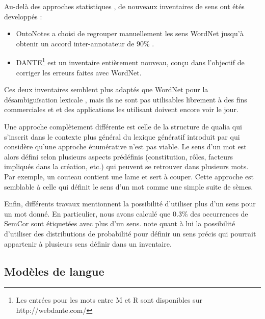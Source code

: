 
Au-delà des approches statistiques \citep{snow2007learning}, de nouveaux
inventaires de sens ont étés developpés :

\begin{itemize}

    \item OntoNotes \citep{hovy2006ontonotes} a choisi de regrouper
        manuellement les sens WordNet jusqu'à obtenir un accord
        inter-annotateur de 90\% .

    \item DANTE\footnote{Les entrées pour les mots entre M et R sont
        disponibles sur http://webdante.com/} \citep{mccarthy2010dante} est un
        inventaire entièrement nouveau, conçu dans l'objectif de corriger les
        erreurs faites avec WordNet\citep{kilgarriff2010detailed}.


\end{itemize}

Ces deux inventaires semblent plus adaptés que WordNet pour la désambiguïsation
lexicale \citep{navigli2012quick}, mais ils ne sont pas utilisables librement à
des fins commerciales et et des applications les utilisant doivent encore voir
le jour.

Une approche complètement différente est celle de la structure de qualia
\citep{johnston1996qualia} qui s'inscrit dans le contexte plus général du
lexique génératif introduit par \cite{pustejovsky1991generative} qui considère
qu'une approche énumérative n'est pas viable. Le sens d'un mot est alors défini
selon plusieurs aspects prédéfinis (constitution, rôles, facteurs impliqués
dans la création, etc.) qui peuvent se retrouver dans plusieurs mots. Par
exemple, un couteau contient une lame et sert à couper. Cette approche est
semblable à celle qui définit le sens d'un mot comme une simple suite de sèmes.

Enfin, différents travaux mentionnent la possibilité d'utiliser plus d'un sens
pour un mot donné.
En particulier, nous avons calculé que 0.3\% des occurrences de SemCor sont
étiquetées avec plus d'un sens. \cite{smith2011rumble} note quant à lui la
possibilité d'utiliser des distributions de probabilité pour définir un sens
précis qui pourrait appartenir à plusieurs sens définir dans un inventaire.


\subsection{Modèles de langue}

